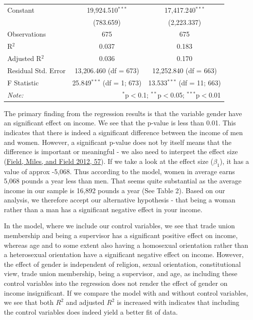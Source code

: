 \documentclass[
]{article}
\begin{document}
\begin{table}[H]
\begin{tabular}{@{\hspace{5pt}}l@{\hspace{5pt}}cc}
 \addlinespace 
 Constant & 19,924.510$^{***}$ & 17,417.240$^{***}$ \\ 
  & (783.659) & (2,223.337) \\ 
 \addlinespace 
\midrule  
Observations & 675 & 675 \\ 
R$^{2}$ & 0.037 & 0.183 \\ 
Adjusted R$^{2}$ & 0.036 & 0.170 \\ 
Residual Std. Error & 13,206.460 (df = 673) & 12,252.840 (df = 663) \\ 
F Statistic & 25.849$^{***}$ (df = 1; 673) & 13.533$^{***}$ (df = 11; 663) \\ 
\bottomrule 
\textit{Note:}  & \multicolumn{2}{r}{$^{*}$p$<$0.1; $^{**}$p$<$0.05; $^{***}$p$<$0.01} \\ 
\end{tabular} 
\end{table}

The primary finding from the regression results is that the variable
gender have an significant effect on income. We see that the p-value is
less than 0.01. This indicates that there is indeed a significant
difference between the income of men and women. However, a significant
p-value does not by itself means that the difference is important or
meaningful - we also need to interpret the effect size
(\protect\hyperlink{ref-field2012discovering}{Field, Miles, and Field
2012, 57}). If we take a look at the effect size (\(\beta_1\)), it has a
value of approx -5,068. Thus according to the model, women in average
earns 5,068 pounds a year less than men. That seems quite substantial as
the average income in our sample is 16,892 pounds a year (See Table 2).
Based on our analysis, we therefore accept our alternative hypothesis -
that being a woman rather than a man has a significant negative effect
in your income.

In the model, where we include our control variables, we see that trade
union membership and being a supervisor has a significant positive
effect on income, whereas age and to some extent also having a
homosexual orientation rather than a heterosexual orientation have a
significant negative effect on income. However, the effect of gender is
independent of religion, sexual orientation, constitutional view, trade
union membership, being a supervisor, and age, as including these
control variables into the regression does not render the effect of
gender on income insignificant. If we compare the model with and without
control variables, we see that both \(R^2\) and adjusted \(R^2\) is
increased with indicates that including the control variables does
indeed yield a better fit of data.
\end{document}
